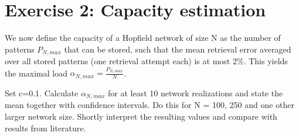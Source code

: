 \section{Exercise 2: Capacity estimation}

\begin{itshape}
\small
We now define the capacity of a Hopfield network of size N as the number of patterns $P_{N,max}$ that can be stored, such that the mean retrieval error averaged over all stored patterns (one retrieval attempt each) is at most 2$\%$. This yields the maximal load $\alpha_{N,max} = \frac{P_{N,max} }{N}$.

Set c=0.1. Calculate $\alpha_{N,max}$ for at least 10 network realizations and state the mean together with confidence intervals. Do this for N = 100, 250 and one other larger network size. Shortly interpret the resulting values and compare with results from literature.
\end{itshape}

\paragraph*{}


%

